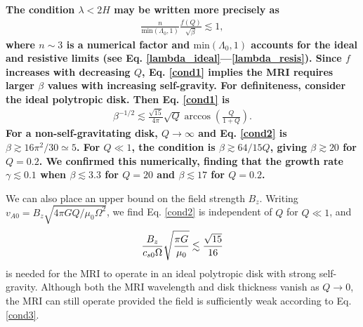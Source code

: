 {\bf
  The condition $\lambda < 2H$ 
  may be written more precisely as 
  \begin{align}\label{cond1}
    \frac{n}{\mathrm{min}(\Lambda_0, 1)}\frac{f(Q)}{\sqrt{\beta}} \lesssim 1,
  \end{align}
  where $n\sim 3$ is a numerical factor and
  $\mathrm{min}(\Lambda_0,1)$ accounts for the ideal and resistive
  limits (see Eq. \ref{lambda_ideal}---\ref{lambda_resis}). Since $f$
  increases with decreasing $Q$, Eq. \ref{cond1} implies
  the MRI requires larger $\beta$ values with  
  increasing self-gravity. 
  For definiteness, consider the ideal polytropic disk. Then Eq. \ref{cond1} is
  \begin{align}\label{cond2}
    \beta^{-1/2} \lesssim
    \frac{\sqrt{15}}{4\pi}\sqrt{Q}\arccos{\left(\frac{Q}{1+Q}\right)}. 
  \end{align}
  For a non-self-gravitating disk, $Q\to\infty$ and Eq. \ref{cond2} is
  $\beta \gtrsim 16\pi^2/30\simeq 5$. For $Q\ll 1$, the condition is
  $\beta \gtrsim 64/15Q$, giving $\beta\gtrsim 20$ for
  $Q=0.2$. We confirmed this numerically, finding that the growth rate
  $\gamma  \lesssim 0.1$ when $\beta \lesssim 3.3$ for $Q=20$ and
  $\beta \lesssim 17$ for $Q=0.2$.  

  We can also place an upper bound on the field strength
  $B_z$. Writing $v_{A0} = B_z\sqrt{4\pi G Q/\mu_0\Omega^2}$, we find 
  Eq. \ref{cond2} is independent of $Q$ for $Q\ll1$, and 
  \begin{align}\label{cond3}
    \frac{B_z}{c_{s0}\Omega}\sqrt{\frac{\pi G}{\mu_0}}\lesssim
    \frac{\sqrt{15}}{16}
  \end{align}
  is needed for the MRI to operate in an ideal polytropic disk with strong
  self-gravity. Although both the MRI wavelength and disk thickness
  vanish as $Q\to 0$, the MRI can still operate provided the field is
  sufficiently weak according to Eq. \ref{cond3}.  


}
